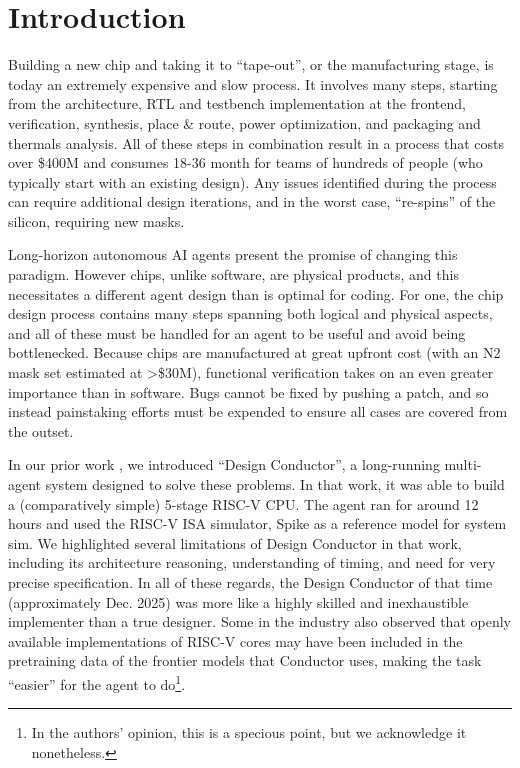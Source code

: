 \section{Introduction}
\label{sec:intro}

Building a new chip and taking it to ``tape-out'', or the manufacturing stage, is today an extremely expensive and slow process. It involves many steps, starting from the architecture, RTL and testbench implementation at the frontend, verification, synthesis, place \& route, power optimization, and packaging and thermals analysis. All of these steps in combination result in a process that costs over \$400M and consumes 18-36 month for teams of hundreds of people (who typically start with an existing design). Any issues identified during the process can require additional design iterations, and in the worst case, ``re-spins'' of the silicon, requiring new masks.

Long-horizon autonomous AI agents present the promise of changing this paradigm. However chips, unlike software, are physical products, and this necessitates a different agent design than is optimal for coding. For one, the chip design process contains many steps spanning both logical and physical aspects, and all of these must be handled for an agent to be useful and avoid being bottlenecked. Because chips are manufactured at great upfront cost (with an N2 mask set estimated at >\$30M), functional verification takes on an even greater importance than in software. Bugs cannot be fixed by pushing a patch, and so instead painstaking efforts must be expended to ensure all cases are covered from the outset.

In our prior work \cite{team2026design}, we introduced ``Design Conductor'', a long-running multi-agent system designed to solve these problems. In that work, it was able to build a (comparatively simple) 5-stage RISC-V CPU. The agent ran for around 12 hours and used the RISC-V ISA simulator, Spike \cite{spike} as a reference model for system sim. We highlighted several limitations of Design Conductor in that work, including its architecture reasoning, understanding of timing, and need for very precise specification. In all of these regards, the Design Conductor of that time (approximately Dec. 2025) was more like a highly skilled and inexhaustible implementer than a true designer. Some in the industry also observed that openly available implementations of RISC-V cores may have been included in the pretraining data of the frontier models that Conductor uses, making the task ``easier'' for the agent to do\footnote{In the authors' opinion, this is a specious point, but we acknowledge it nonetheless.}.

